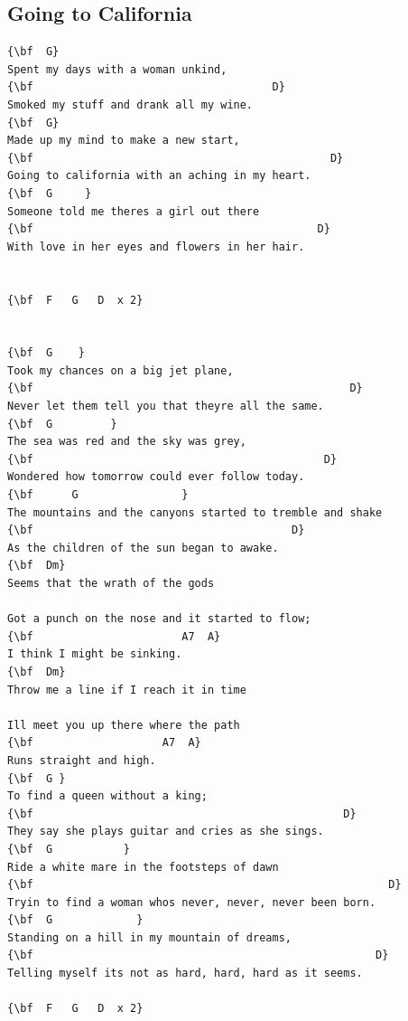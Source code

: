 \documentclass[a4paper]{article}
\begin{document}
\subsection{Going to California}
\begin{Verbatim}[commandchars=\\\{\}]
{\bf  G}
Spent my days with a woman unkind,
{\bf                                     D}
Smoked my stuff and drank all my wine.
{\bf  G}
Made up my mind to make a new start,
{\bf                                              D}
Going to california with an aching in my heart.
{\bf  G     }
Someone told me theres a girl out there
{\bf                                            D}
With love in her eyes and flowers in her hair.


{\bf  F   G   D  x 2}


{\bf  G    }
Took my chances on a big jet plane,
{\bf                                                 D}
Never let them tell you that theyre all the same.
{\bf  G         }
The sea was red and the sky was grey,
{\bf                                             D}
Wondered how tomorrow could ever follow today.
{\bf      G                }
The mountains and the canyons started to tremble and shake
{\bf                                        D}
As the children of the sun began to awake.
{\bf  Dm}
Seems that the wrath of the gods

Got a punch on the nose and it started to flow;
{\bf                       A7  A}
I think I might be sinking.
{\bf  Dm}
Throw me a line if I reach it in time

Ill meet you up there where the path
{\bf                    A7  A}
Runs straight and high.
{\bf  G }
To find a queen without a king;
{\bf                                                D}
They say she plays guitar and cries as she sings.
{\bf  G           }
Ride a white mare in the footsteps of dawn
{\bf                                                       D}
Tryin to find a woman whos never, never, never been born.
{\bf  G             }
Standing on a hill in my mountain of dreams,
{\bf                                                     D}
Telling myself its not as hard, hard, hard as it seems.

{\bf  F   G   D  x 2}

\end{Verbatim}
\newpage
\end{document}
